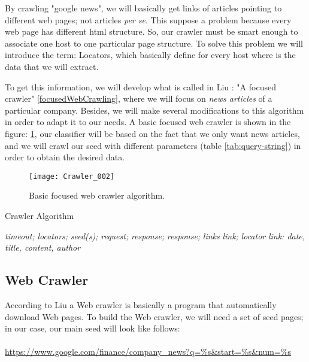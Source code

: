 By crawling "google news", we will basically get links of articles pointing to different web pages; not articles \emph{per se}. This suppose a problem because every web page has different html structure. So, our crawler must be smart enough to associate one host to one particular page structure. To solve this problem we will introduce the term: Locators, which basically define for every host where is the data that we will extract.

To get this information, we will develop what is called in Liu \cite%
{L2011}: "A focused crawler" \ref{focusedWebCrawling}, where we will focus on \emph{news articles} of a particular company. Besides, we will make several modifications to this algorithm in order to adapt it to our needs. A basic focused web crawler is shown in the figure: \ref{fig:Crawler_002}, our classifier will be based on the fact that we only want news articles, and we will crawl our seed with different parameters (table \ref{tab:query-string}) in order to obtain the desired data.

	\begin{figure}\centering
		\texttt{[image: Crawler\_002]}
		\caption{Basic focused web crawler algorithm.}\label{fig:Crawler_002}
	\end{figure}

\begin{algorithm}
\caption{Crawler Algorithm}\label{crawlerAlgorithm}
\begin{algorithmic}[1]
\STATE {} \textit{timeout;}
\STATE {} \textit{locators;}
\STATE {} \textit{seed(s);}
\STATE {} \textit{request;}
\STATE {} \textit{response;}
\STATE {} \textit{response;}
\STATE {} \textit{links}  
	\STATE {} \textit{link;}
	\STATE {} \textit{locator} 
	\STATE {} \textit{link: date, title, content, author}\text{;}
	\STATE {}
\ENDFOR
\end{algorithmic}
\end{algorithm}

\subsection{Web Crawler}\label{webCrawler}

According to Liu \cite%
{L2011} a Web crawler is basically a program that automatically download Web pages. To build the Web crawler, we will need a set of seed pages; in our case, our main seed will look like follows: 
\\\\
\url{https://www.google.com/finance/company\_news?q=\%s&start=\%s&num=\%s}
\\\\

